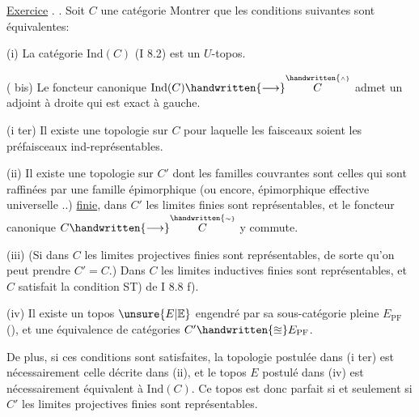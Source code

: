 
\uline{Exercice} . . Soit $C$ une  catégorie\handwritten{,} Montrer que les conditions suivantes sont équivalentes:

(i) La catégorie $\mathrm{Ind}(C)$ (I 8.2) est un \uline{$U$}-topos.

( bis) Le foncteur canonique $\mathrm{Ind}(C)\handwritten{\longrightarrow}\overset{\handwritten{\scriptscriptstyle\wedge}}{C}$ admet un adjoint à droite qui  est exact à gauche.

(i ter) Il existe une topologie sur $C$ pour laquelle les faisceaux soient les préfaisceaux ind-représentables.


(ii)  Il existe une topologie sur $C'$ dont les familles couvrantes sont celles qui sont raffinées par une famille épimorphique (ou encore, épimorphique effective universelle ..) \uline{finie}, dans $C'$ les limites  finies sont représentables, et le foncteur canonique $C\handwritten{\longrightarrow}\overset{\handwritten{\scriptscriptstyle\sim}}{C}$  y commute.

(iii) (Si dans $C$ les limites projectives finies sont représentables, de sorte qu'on peut prendre $C'=C$.) Dans $C$ les limites inductives finies sont représentables, et $C$ satisfait la condition ST) de I 8.8 f).
\margin{\handwritten{$\times$}}

(iv) Il existe un topos $\unsure{E|\mathbb{E}}$ engendré par sa sous-catégorie pleine $E_{\mathrm{PF}}$ (\quad\quad), et une équivalence de catégories $C'\handwritten{\approxeq}E_{\mathrm{PF}}$.
\margin{\handwritten{$\times$}}

De plus,  si ces conditions sont satisfaites, la topologie postulée dans (i ter) est nécessairement celle décrite dans (ii), et le topos $E$ postulé dans (iv) est nécessairement équivalent à $\mathrm{Ind}(C)$. Ce topos est donc parfait si et seulement si  $C'$  les limites projectives finies sont représentables.
